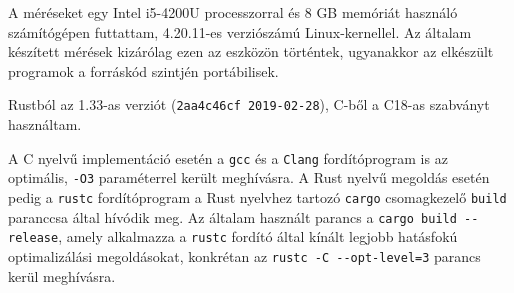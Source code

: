 
A méréseket egy Intel i5-4200U processzorral és 8 GB memóriát használó számítógépen futtattam, 4.20.11-es verziószámú Linux-kernellel. Az általam készített mérések kizárólag ezen az eszközön történtek, ugyanakkor az elkészült programok a forráskód szintjén portábilisek.

Rustból az 1.33-as verziót (\lstinline{2aa4c46cf 2019-02-28}), C-ből a C18-as szabványt használtam.

A C nyelvű implementáció esetén a \lstinline{gcc} és a \lstinline{Clang} fordítóprogram is az optimális, \lstinline{-O3} paraméterrel került meghívásra. A Rust nyelvű megoldás esetén pedig a \lstinline{rustc} fordítóprogram a Rust nyelvhez tartozó \lstinline{cargo} csomagkezelő \lstinline{build} paranccsa által hívódik meg. Az általam használt parancs a \lstinline{cargo build --release}, amely alkalmazza a \lstinline{rustc} fordító által kínált legjobb hatásfokú optimalizálási megoldásokat, konkrétan az \lstinline{rustc -C --opt-level=3} parancs kerül meghívásra.
